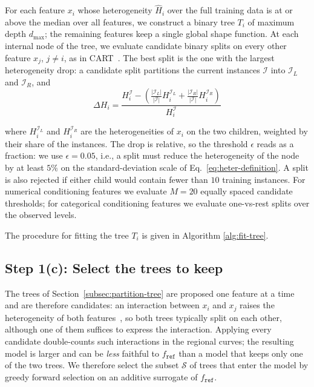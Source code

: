 For each feature \(x_i\) whose heterogeneity \(\hat{H}_i\) over the full training data is at or above the median over all features, we construct a binary tree \(T_i\) of maximum depth \(d_{\max}\); the remaining features keep a single global shape function.
At each internal node of the tree, we evaluate candidate binary splits on every other feature \(x_j\), \(j \neq i\), as in CART~\cite{breiman1984cart}.
The best split is the one with the largest heterogeneity drop: a candidate split partitions the current instances $\mathcal{I}$ into $\mathcal{I}_L$ and $\mathcal{I}_R$, and
\begin{equation}
\label{eq:heter-drop}
\Delta H_i = \frac{H_i^{\mathcal{I}} - \left ( \frac{|\mathcal{I}_L|}{|\mathcal{I}|}H_i^{\mathcal{I}_L} + \frac{|\mathcal{I}_R|}{|\mathcal{I}|}H_i^{\mathcal{I}_R}  \right )}{H_i^{\mathcal{I}}}
\end{equation}

where \(H_i^{\mathcal{I}_L}\) and \(H_i^{\mathcal{I}_R}\) are the heterogeneities of \(x_i\) on the two children, weighted by their share of the instances.
The drop is relative, so the threshold $\epsilon$ reads as a fraction: we use $\epsilon = 0.05$, i.e., a split must reduce the heterogeneity of the node by at least $5\%$ on the standard-deviation scale of Eq.~\eqref{eq:heter-definition}.
A split is also rejected if either child would contain fewer than $10$ training instances.
For numerical conditioning features we evaluate $M = 20$ equally spaced candidate thresholds; for categorical conditioning features we evaluate one-vs-rest splits over the observed levels.

The procedure for fitting the tree $T_i$ is given in Algorithm \ref{alg:fit-tree}.

\subsection{Step 1(c): Select the trees to keep}
\label{subsec:selection}

The trees of Section~\ref{subsec:partition-tree} are proposed one feature at a time and are therefore candidates: an interaction between $x_i$ and $x_j$ raises the heterogeneity of both features~\cite[Thm.~2]{herbinger2024GADGET}, so both trees typically split on each other, although one of them suffices to express the interaction.
Applying every candidate double-counts such interactions in the regional curves; the resulting model is larger and can be \emph{less} faithful to $f_{\texttt{ref}}$ than a model that keeps only one of the two trees.
We therefore select the subset $\mathcal{S}$ of trees that enter the model by greedy forward selection on an additive surrogate of $f_{\texttt{ref}}$.

